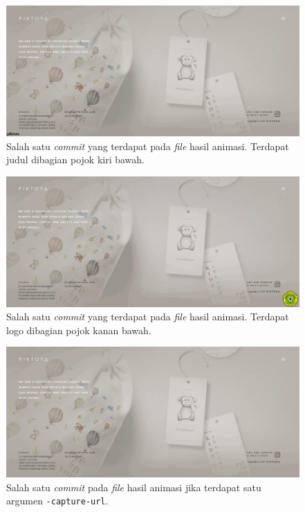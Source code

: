 \ \\
\ \\
\begin{figure}[H]
	\centering
		\includegraphics[scale=0.3]{Gambar/title.png}
	\caption{Salah satu \textit{commit} yang terdapat pada \textit{file} hasil animasi. Terdapat judul dibagian pojok kiri bawah.}
	\label{fig:title}
\end{figure}


\begin{figure}[H]
	\centering
		\includegraphics[scale=0.3]{Gambar/logo.png}
	\caption{Salah satu \textit{commit} yang terdapat pada \textit{file} hasil animasi. Terdapat logo dibagian pojok kanan bawah.}
	\label{fig:logo}
\end{figure}

\begin{figure}[H]
	\centering
		\includegraphics[scale=0.3]{Gambar/capture1.png}
	\caption{Salah satu \textit{commit} pada \textit{file} hasil animasi jika terdapat satu argumen \texttt{-capture-url}.}
	\label{fig:capture1}
\end{figure}




